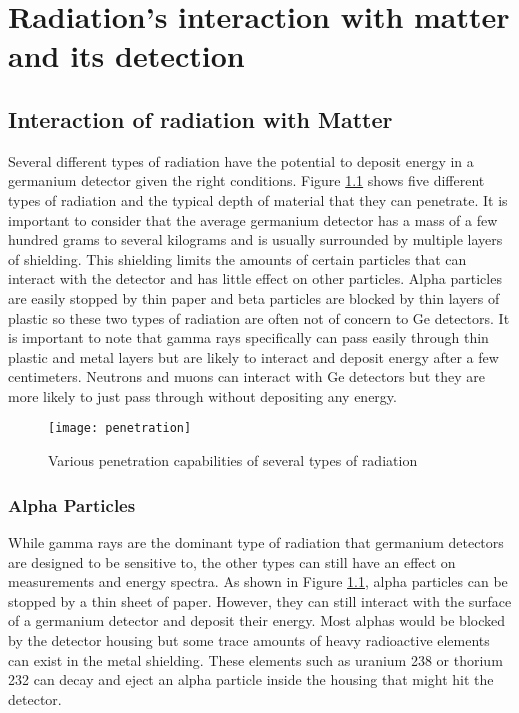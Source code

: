 \chapter{Radiation's interaction with matter and its detection}

\section{Interaction of radiation with Matter}
Several different types of radiation have the potential to deposit energy in a germanium detector given the right conditions.
Figure \ref{fig:penetration} shows five different types of radiation and the typical depth of material that they can penetrate.
It is important to consider that the average germanium detector has a mass of a few hundred grams to several kilograms and is usually surrounded by multiple layers of shielding.
This shielding limits the amounts of certain particles that can interact with the detector and has little effect on other particles.
Alpha particles are easily stopped by thin paper and beta particles are blocked by thin layers of plastic so these two types of radiation are often not of concern to Ge detectors.
It is important to note that gamma rays specifically can pass easily through thin plastic and metal layers but are likely to interact and deposit energy after a few centimeters.
Neutrons and muons can interact with Ge detectors but they are more likely to just pass through without depositing any energy.
\begin{figure}[htpb]
\centering
\texttt{[image: penetration]}
\caption{Various penetration capabilities of several types of radiation}
\label{fig:penetration}
\end{figure}

\subsection{Alpha Particles}
While gamma rays are the dominant type of radiation that germanium detectors are designed to be sensitive to, the other types can still have an effect on measurements and energy spectra.
As shown in Figure \ref{fig:penetration}, alpha particles can be stopped by a thin sheet of paper.
However, they can still interact with the surface of a germanium detector and deposit their energy.
Most alphas would be blocked by the detector housing but some trace amounts of heavy radioactive elements can exist in the metal shielding.
These elements such as uranium 238 or thorium 232 can decay and eject an alpha particle inside the housing that might hit the detector.

